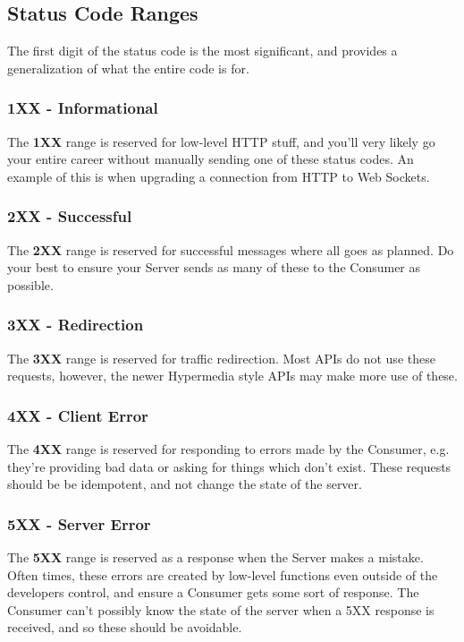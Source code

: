 \documentclass{book}
\begin{document}
\subsection{Status Code Ranges}

The first digit of the status code is the most significant, and provides a generalization of what the entire code is for.

\subsubsection{1XX - Informational}

The \textbf{1XX} range is reserved for low-level HTTP stuff, and you'll very likely go your entire career without manually sending one of these status codes. An example of this is when upgrading a connection from HTTP to Web Sockets.

\subsubsection{2XX - Successful}

The \textbf{2XX} range is reserved for successful messages where all goes as planned. Do your best to ensure your Server sends as many of these to the Consumer as possible.

\subsubsection{3XX - Redirection}

The \textbf{3XX} range is reserved for traffic redirection. Most APIs do not use these requests, however, the newer Hypermedia style APIs may make more use of these.

\subsubsection{4XX - Client Error}

The \textbf{4XX} range is reserved for responding to errors made by the Consumer, e.g. they're providing bad data or asking for things which don't exist. These requests should be be idempotent, and not change the state of the server.

\subsubsection{5XX - Server Error}

The \textbf{5XX} range is reserved as a response when the Server makes a mistake. Often times, these errors are created by low-level functions even outside of the developers control, and ensure a Consumer gets some sort of response. The Consumer can't possibly know the state of the server when a 5XX response is received, and so these should be avoidable.
\end{document}
